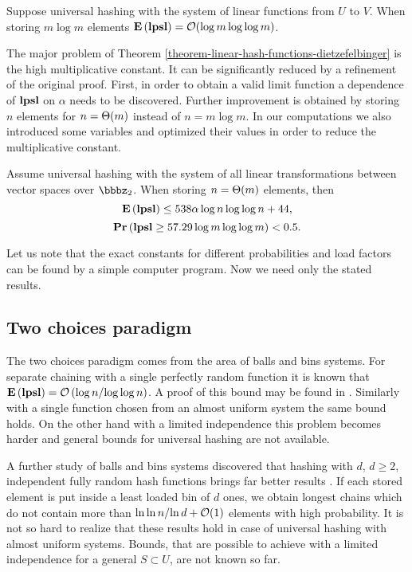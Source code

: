 \begin{theorem}
\label{theorem-linear-hash-functions-dietzefelbinger}
Suppose universal hashing with the system of linear functions from $U$ to $V$. When storing $m \log m$ elements $\mathbf{E}\left(\mathbf{lpsl}\right) = \mathcal{O}(\log m \log \log m)$. 
\end{theorem}

The major problem of Theorem \ref{theorem-linear-hash-functions-dietzefelbinger} is the high multiplicative constant. It can be significantly reduced by a refinement of the original proof. First, in order to obtain a valid limit function a dependence of $\mathbf{lpsl}$ on $\alpha$ needs to be discovered. Further improvement is obtained by storing $n$ elements for $n = \mathrm{\Theta}(m)$ instead of $n = m \log m$. In our computations we also introduced some variables and optimized their values in order to reduce the multiplicative constant.

\begin{theorem}
Assume universal hashing with the system of all linear transformations between vector spaces over $\bbbz_2$. When storing $n = \mathrm{\Theta}(m)$ elements, then $$\mathbf{E}\left(\mathbf{lpsl}\right) \leq 538 \alpha \log n \log \log n + 44,$$ $$\mathbf{Pr}\left(\mathbf{lpsl} \geq 57.29 \log m \log \log m\right) < 0.5.$$
\end{theorem}

Let us note that the exact constants for different probabilities and load factors can be found by a simple computer program. Now we need only the stated results.

\subsection{Two choices paradigm}
The two choices paradigm comes from the area of balls and bins systems. For separate chaining with a single perfectly random function it is known that $\mathbf{E}\left(\mathbf{lpsl}\right) = \mathcal{O}\left({\log n}/{\log \log n}\right)$. A proof of this bound may be found in \cite{DBLP:books/sp/Mehlhorn84}. Similarly with a single function chosen from an almost uniform system the same bound holds. On the other hand with a limited independence this problem becomes harder and general bounds for universal hashing are not available.

A further study of balls and bins systems discovered that hashing with $d$, $d \geq 2$, independent fully random hash functions brings far better results \cite{DBLP:conf/stoc/AzarBKU94}. If each stored element is put inside a least loaded bin of $d$ ones, we obtain longest chains which do not contain more than ${\ln \ln n}/{\ln d} + \mathcal{O}(1)$ elements with high probability. It is not so hard to realize that these results hold in case of universal hashing with almost uniform systems. Bounds, that are possible to achieve with a limited independence for a general $S \subset U$, are not known so far.

